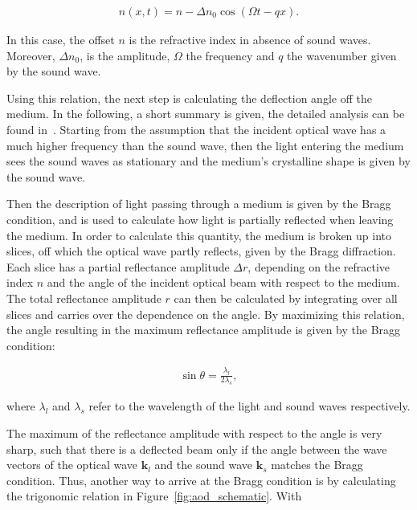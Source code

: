 \begin{align}
	n(x, t) = n - \Delta n_0 \cos{\left(\Omega t - q x\right)}.
\end{align}

In this case, the offset $n$ is the refractive index in absence of sound waves. Moreover, $\Delta n_0$, is the amplitude, $\Omega$ the frequency and $q$ the wavenumber given by the sound wave.

Using this relation, the next step is calculating the deflection angle off the medium. In the following, a short summary is given, the detailed analysis can be found in~\cite{Saleh1991}. Starting from the assumption that the incident optical wave has a much higher frequency than the sound wave, then the light entering the medium sees the sound waves as stationary and the medium's crystalline shape is given by the sound wave.

Then the description of light passing through a medium is given by the Bragg condition, and is used to calculate how light is partially reflected when leaving the medium. In order to calculate this quantity, the medium is broken up into slices, off which the optical wave partly reflects, given by the Bragg diffraction. Each slice has a partial reflectance amplitude $\Delta r$, depending on the refractive index $n$ and the angle of the incident optical beam with respect to the medium. The total reflectance amplitude $r$ can then be calculated by integrating over all slices and carries over the dependence on the angle. By maximizing this relation, the angle resulting in the maximum reflectance amplitude is given by the Bragg condition:


\begin{align}
	\sin \theta = \frac{\lambda_l}{2 \lambda_s},
\end{align}

where $\lambda_l$ and $\lambda_s$ refer to the wavelength of the light and sound waves respectively.

The maximum of the reflectance amplitude with respect to the angle is very sharp, such that there is a deflected beam only if the angle between the wave vectors of the optical wave $\mathbf{k}_l$ and the sound wave $\mathbf{k}_s$ matches the Bragg condition. Thus, another way to arrive at the Bragg condition is by calculating the trigonomic relation in Figure~\ref{fig:aod_schematic}. With

